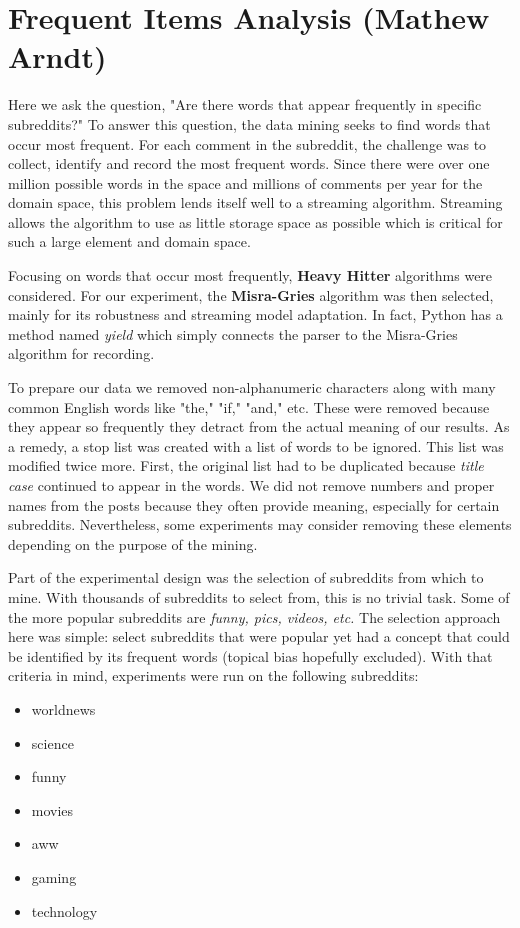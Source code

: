 \documentclass[12pt]{article}
\numberwithin{equation}{section}
\begin{document}
	

\section*{Frequent Items Analysis (Mathew Arndt)}	
	
Here we ask the question, "Are there words that appear frequently in specific subreddits?"  To answer this question, the data mining seeks to find words that occur most frequent.  For each comment in the subreddit, the challenge was to collect, identify and record the most frequent words.  Since there were over one million possible words in the space and millions of comments per year for the domain space, this problem lends itself well to a streaming algorithm.  Streaming allows the algorithm to use as little storage space as possible which is critical for such a large element and domain space.  

Focusing on words that occur most frequently, \textbf{Heavy Hitter} algorithms were considered.  For our experiment, the \textbf{Misra-Gries} algorithm was then selected, mainly for its robustness and streaming model adaptation.  In fact, Python has a method named \textit{yield} which simply connects the parser to the Misra-Gries algorithm for recording.

To prepare our data we removed non-alphanumeric characters along with many common English words like "the," "if," "and," etc.   These were removed because they appear so frequently they detract from the actual meaning of our results.    As a remedy, a stop list was created with a list of words to be ignored.  This list was modified twice more.  First, the original list had to be duplicated because \textit{title case} continued to appear in the words.   We did not remove numbers and proper names from the posts because they often provide meaning, especially for certain subreddits.  Nevertheless, some experiments may consider removing these elements depending on the purpose of the mining.

Part of the experimental design was the selection of subreddits from which to mine.  With thousands of subreddits to select from, this is no trivial task.  Some of the more popular subreddits are \textit{funny, pics, videos, etc.}  The selection approach here was simple:  select subreddits that were popular yet had a concept that could be identified by its frequent words (topical bias hopefully excluded).   With that criteria in mind, experiments were run on the following subreddits: 

\begin{itemize} \itemsep1pt \parskip0pt 

  \item worldnews
  \item science
  \item funny
  \item movies
  \item aww
  \item gaming
  \item technology
  
\end{itemize}
\end{document}
